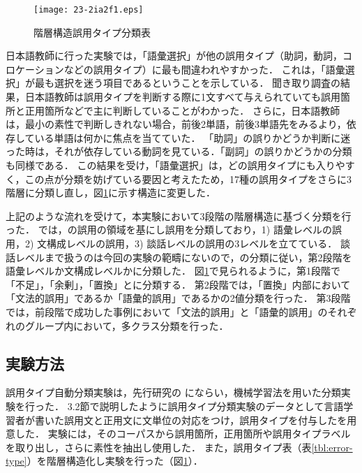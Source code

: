 \documentclass[japanese]{jnlp_1.4}
\newcommand{\ngc}{}
\begin{document}
\begin{figure}[b]
\begin{center}
\texttt{[image: 23-2ia2f1.eps]}
\end{center}
\caption{階層構造誤用タイプ分類表}
\label{fig:tree-tagset}
\end{figure}

日本語教師に行った実験では，「語彙選択」が他の誤用タイプ（助詞，動詞，コロケーションなどの誤用タイプ）に最も間違われやすかった．
これは，「語彙選択」が最も選択を迷う項目であるということを示している．
聞き取り調査の結果，日本語教師は誤用タイプを判断する際に1文すべて与えられていても誤用箇所と正用箇所などで主に判断していることがわかった．
さらに，日本語教師は，最小の素性で判断しきれない場合，前後2単語，前後3単語先をみるより，依存している単語は何かに焦点を当てていた．
「助詞」の誤りかどうか判断に迷った時は，それが依存している動詞を見ている．「副詞」の誤りかどうかの分類も同様である．
この結果を受け，「語彙選択」は，どの誤用タイプにも入りやすく，この点が分類を妨げている要因と考えたため，17種の誤用タイプをさらに3階層に分類し直し，図\ref{fig:tree-tagset}に示す構造に変更した．

上記のような流れを受けて，本実験において3段階の階層構造に基づく分類を行った．
では，の誤用の領域を基にし誤用を分類しており，1) 語彙レベルの誤用，2) 文構成レベルの誤用，3) 談話レベルの誤用の3レベルを立てている．
談話レベルまで扱うのは今回の実験の範疇にないので，の分類に従い，第2段階を語彙レベルか文構成レベルかに分類した．
図\ref{fig:tree-tagset}で見られるように，第1段階で「不足」，「余剰」，「置換」とに分類する．
第2段階では，「置換」内部において「文法的誤用」であるか「語彙的誤用」であるかの2値分類を行った．
第3段階では，前段階で成功した事例において「文法的誤用」と「語彙的誤用」のそれぞれのグループ内において，多クラス分類を行った．


\subsection{実験方法}

誤用タイプ自動分類実験は，先行研究の にならい，機械学習法を用いた分類実験を行った．
3.2節で説明したように誤用タイプ分類実験のデータとして言語学習者が書いた誤用文と正用文に文単位の対応をつけ，誤用タイプを付与した\ngc\hbox{}を用意した．
実験には，そのコーパスから誤用箇所，正用箇所や誤用タイプラベルを取り出し，さらに素性を抽出し使用した．
また，誤用タイプ表（表\ref{tbl:error-type}）を階層構造化し実験を行った（図\ref{fig:tree-tagset}）．
\end{document}
